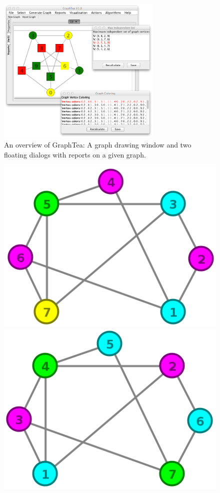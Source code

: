 \documentclass[12pt, oneside]{book}
\begin{document}
\begin{figure}
\centering
\includegraphics[width=0.7\textwidth]{graphtea}
\caption{An overview of GraphTea: A graph drawing window and 
two floating dialogs with reports on a given graph.}
\label{f.graphtea}
\end{figure}

\begin{figure}
\centering
   \includegraphics[width=0.45\linewidth]{bad_order_color}
   \hfill
   \includegraphics[width=0.45\linewidth]{good_order_color}
\end{figure}
\end{document}
